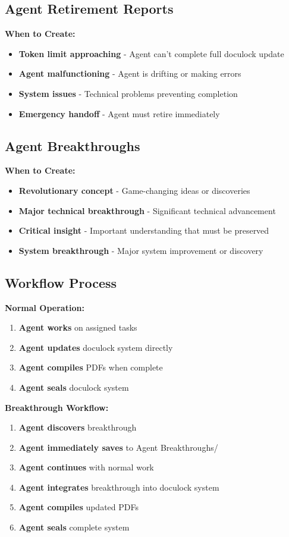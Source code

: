 \documentclass[12pt,a4paper]{article}
\begin{document}
\subsection{Agent Retirement Reports}
\textbf{When to Create:}
\begin{itemize}
    \item \textbf{Token limit approaching} - Agent can't complete full doculock update
    \item \textbf{Agent malfunctioning} - Agent is drifting or making errors
    \item \textbf{System issues} - Technical problems preventing completion
    \item \textbf{Emergency handoff} - Agent must retire immediately
\end{itemize}

\subsection{Agent Breakthroughs}
\textbf{When to Create:}
\begin{itemize}
    \item \textbf{Revolutionary concept} - Game-changing ideas or discoveries
    \item \textbf{Major technical breakthrough} - Significant technical advancement
    \item \textbf{Critical insight} - Important understanding that must be preserved
    \item \textbf{System breakthrough} - Major system improvement or discovery
\end{itemize}

\subsection{Workflow Process}
\textbf{Normal Operation:}
\begin{enumerate}
    \item \textbf{Agent works} on assigned tasks
    \item \textbf{Agent updates} doculock system directly
    \item \textbf{Agent compiles} PDFs when complete
    \item \textbf{Agent seals} doculock system
\end{enumerate}

\textbf{Breakthrough Workflow:}
\begin{enumerate}
    \item \textbf{Agent discovers} breakthrough
    \item \textbf{Agent immediately saves} to Agent Breakthroughs/
    \item \textbf{Agent continues} with normal work
    \item \textbf{Agent integrates} breakthrough into doculock system
    \item \textbf{Agent compiles} updated PDFs
    \item \textbf{Agent seals} complete system
\end{enumerate}
\end{document}
